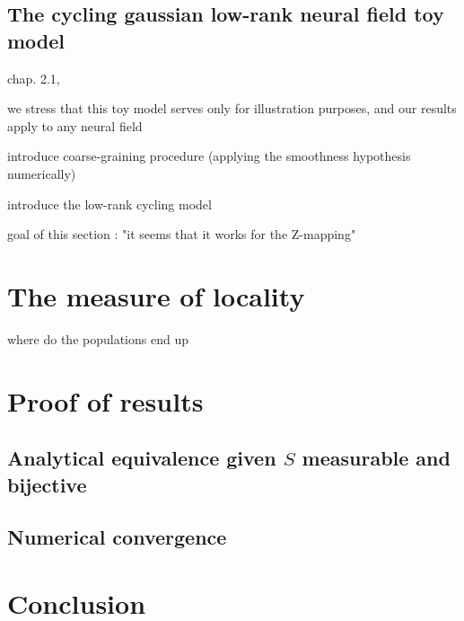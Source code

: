 \documentclass[10pt,letterpaper]{article}
\begin{document}
\subsection{The cycling gaussian low-rank neural field toy model}

chap. 2.1, 

we stress that this toy model serves only for illustration purposes, and our results apply to any neural field

introduce coarse-graining procedure (applying the smoothness hypothesis numerically)

introduce the low-rank cycling model

goal of this section : "it seems that it works for the Z-mapping"

\section{The measure of locality}

where do the populations end up 

\section{Proof of results}

\subsection{Analytical equivalence given $S$ measurable and bijective}
\label{sec:proof-equivalence}

\subsection{Numerical convergence}

\section{Conclusion}






\end{document}
